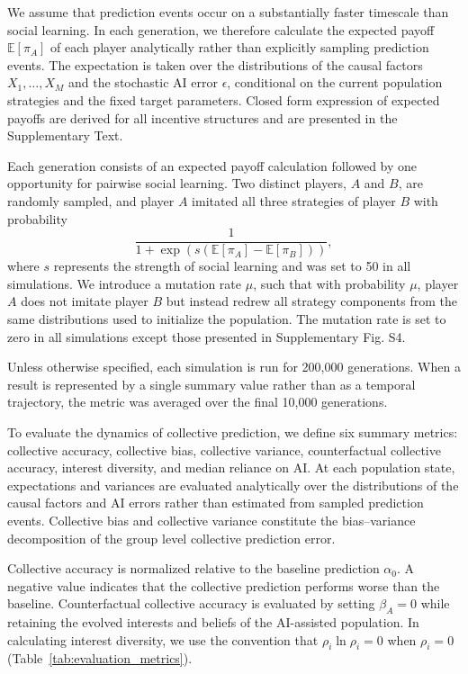 \documentclass[12pt]{article}
\begin{document}
We assume that prediction events occur on a substantially faster timescale than social learning. 
In each generation, we therefore calculate the expected payoff $\mathbb{E}[\pi_A]$ of each player analytically rather than explicitly sampling prediction events. 
The expectation is taken over the distributions of the causal factors $X_1,\ldots,X_M$ and the stochastic AI error $\epsilon$, conditional on the current population strategies and the fixed target parameters. 
Closed form expression of expected payoffs are derived for all incentive structures and are presented in the Supplementary Text.

Each generation consists of an expected payoff calculation followed by one opportunity for pairwise social learning. 
Two distinct players, $A$ and $B$, are randomly sampled, and player $A$ imitated all three strategies of player $B$ with probability
\begin{equation}
\frac{1}{1+\exp\left(s\left(\mathbb{E}[\pi_A]-\mathbb{E}[\pi_B]\right)\right)},
\end{equation}
where $s$ represents the strength of social learning and was set to 50 in all simulations. 
We introduce a mutation rate $\mu$, such that with probability $\mu$, player $A$ does not imitate player $B$ but instead redrew all strategy components from the same distributions used to initialize the population. 
The mutation rate is set to zero in all simulations except those presented in Supplementary Fig. S4.

Unless otherwise specified, each simulation is run for 200,000 generations. 
When a result is represented by a single summary value rather than as a temporal trajectory, the metric was averaged over the final 10,000 generations.

To evaluate the dynamics of collective prediction, we define six summary metrics: collective accuracy, collective bias, collective variance, counterfactual collective accuracy, interest diversity, and median reliance on AI. 
At each population state, expectations and variances are evaluated analytically over the distributions of the causal factors and AI errors rather than estimated from sampled prediction events.
Collective bias and collective variance constitute the bias--variance decomposition of the group level collective prediction error.

Collective accuracy is normalized relative to the baseline prediction $\alpha_0$. 
A negative value indicates that the collective prediction performs worse than the baseline. 
Counterfactual collective accuracy is evaluated by setting $\beta_A=0$ while retaining the evolved interests and beliefs of the AI-assisted population. 
In calculating interest diversity, we use the convention that $\rho_i\ln\rho_i=0$ when $\rho_i=0$ (Table~\ref{tab:evaluation_metrics}).
\end{document}
